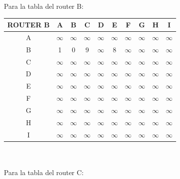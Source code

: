 \documentclass{article}
\begin{document}
Para la tabla del router B:\\
\begin{tabular}{ | c | c | c | c | c | c | c | c | c | c |}
\hline                 
ROUTER B    & A      & B      & C      & D      & E      & F      & G      & H      & I      \\
\hline
        A   &$\infty$&$\infty$&$\infty$&$\infty$&$\infty$&$\infty$&$\infty$&$\infty$&$\infty$\\
\hline
        B   & 1      & 0      & 9      &$\infty$& 8      &$\infty$&$\infty$&$\infty$&$\infty$\\
\hline
        C   &$\infty$&$\infty$&$\infty$&$\infty$&$\infty$&$\infty$&$\infty$&$\infty$&$\infty$\\
\hline
        D   &$\infty$&$\infty$&$\infty$&$\infty$&$\infty$&$\infty$&$\infty$&$\infty$&$\infty$\\
\hline
        E   &$\infty$&$\infty$&$\infty$&$\infty$&$\infty$&$\infty$&$\infty$&$\infty$&$\infty$\\
\hline
        F   &$\infty$&$\infty$&$\infty$&$\infty$&$\infty$&$\infty$&$\infty$&$\infty$&$\infty$\\
\hline
        G   &$\infty$&$\infty$&$\infty$&$\infty$&$\infty$&$\infty$&$\infty$&$\infty$&$\infty$\\
\hline
        H   &$\infty$&$\infty$&$\infty$&$\infty$&$\infty$&$\infty$&$\infty$&$\infty$&$\infty$\\
\hline 
        I   &$\infty$&$\infty$&$\infty$&$\infty$&$\infty$&$\infty$&$\infty$&$\infty$&$\infty$\\
\hline
\end{tabular}
\\\\
Para la tabla del router C:\\
\end{document}
